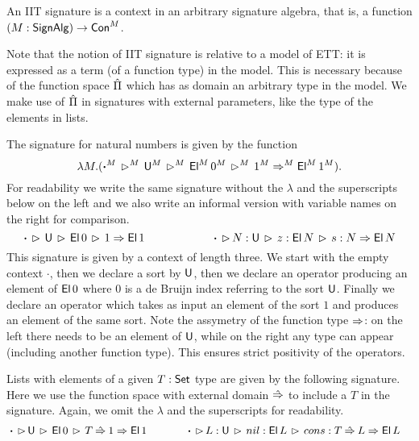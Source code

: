 \documentclass[a4paper,UKenglish,cleveref, autoref]{lipics-v2019}
\begin{document}
\begin{definition}
  An IIT signature is a context in an arbitrary signature algebra,
  that is, a function $(M:\mathsf{SignAlg})\rightarrow\mathsf{Con}^M$.
\end{definition}
Note that the notion of IIT signature is relative to a model of ETT:
it is expressed as a term (of a function type) in the model. This is
necessary because of the function space $\hat{\Pi}$ which has as domain an
arbitrary type in the model. We make use of $\hat{\Pi}$ in signatures with
external parameters, like the type of the elements in lists.

\begin{example}\label{ex:signatures}
  The signature for natural numbers is given by the function
  \[
    \lambda M.(\boldsymbol{\cdot}^M\,\rhd^M\,\mathsf{U}^M\,\rhd^M\,\mathsf{El}^M\,0^M\,\rhd^M\,1^M \Rightarrow^M \mathsf{El}^M\,1^M).
  \]
  For readability we write the same signature without the $\lambda$
  and the superscripts below on the left and we also write an informal
  version with variable names on the right for comparison.
  \[
  \boldsymbol{\cdot}\,\rhd\,\mathsf{U}\,\rhd\,\mathsf{El}\,0\,\rhd\,1 \Rightarrow \mathsf{El}\,1 \hspace{5.9em}
  \boldsymbol{\cdot}\,\rhd\,N:\mathsf{U}\,\rhd\,z : \mathsf{El}\,N\,\rhd\,s : N \Rightarrow \mathsf{El}\,N
  \]
  This signature is given by a context of length three. We start with
  the empty context $\boldsymbol{\cdot}$, then we declare a sort by
  $\mathsf{U}$, then we declare an operator producing an element of $\mathsf{El}\,0$
  where $0$ is a de Bruijn index referring to the sort $\mathsf{U}$. Finally
  we declare an operator which takes as input an element of the sort
  $1$ and produces an element of the same sort. Note the assymetry of
  the function type $\Rightarrow$: on the left there needs to be an element of
  $\mathsf{U}$, while on the right any type can appear (including another
  function type). This ensures strict positivity of the operators.

  Lists with elements of a given $T : \mathsf{Set}$ type are given by the
  following signature. Here we use the function space with external
  domain $\mathbin{\hat{\Rightarrow}}$ to include a $T$ in the signature. Again, we omit the
  $\lambda$ and the superscripts for readability.
  \begin{alignat*}{10}
    & \boldsymbol{\cdot}\,\ext\,\U\,\ext\,\El\,0\,\ext\,T\Ram 1\Ra \El\,1 \hspace{3.56em} \boldsymbol{\cdot}\,\ext\,L:\U\,\ext\,nil : \El\,L\,\ext\,cons : T\Ram L\Ra \El\,L
  \end{alignat*}
 

\end{example}
\end{document}
